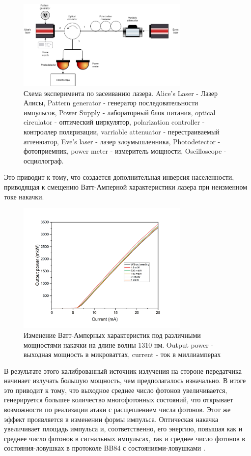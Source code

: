 \begin{figure}
    \centering
    \includegraphics[width=0.75\textwidth]{images/1310 experiment.png}
    \caption{Схема эксперимента по засеиванию лазера. Alice's Laser -  Лазер Алисы, Pattern generator - генератор последовательности импульсов, Power Supply - лабораторный блок питания, optical circulator - оптический циркулятор, polarization controller - контроллер поляризации, varriable attenuator - перестраиваемый аттенюатор, Eve's laser - лазер злоумышленника, Photodetector - фотоприемник, power meter - измеритель мощности, Oscilloscope - осциллограф.}
    \label{fig:exper 1310 ref}
\end{figure}
Это приводит к тому, что создается дополнительная инверсия населенности, приводящая к смещению Ватт-Амперной характеристики лазера при неизменном токе накачки.
\begin{figure}
    \centering
    \includegraphics[width=0.75\textwidth]{images/ватт ампер для диссера.png}
    \caption{Изменение Ватт-Амперных характеристик под различными мощностями накачки на длине волны 1310 нм. Output power - выходная мощность в микроваттах, current - ток в миллиамперах}
    \label{fig:watt-amp ref}
\end{figure}
В результате этого калиброванный источник излучения на стороне передатчика начинает излучать большую мощность, чем предполагалось изначально. В итоге это приводит к тому, что выходное среднее число фотонов увеличивается, генерируется большее количество многофотонных состояний, что открывает возможности по реализации атаки с расщеплением числа фотонов. Этот же эффект проявляется в изменении формы импульса. Оптическая накачка \cite{svelto2010,okamoto2003,guina2017} увеличивает площадь импульса и, соответственно, его энергию, повышая как и среднее число фотонов в сигнальных импульсах, так и среднее число фотонов в состояния-ловушках в протоколе BB84 с состояниями-ловушками \cite{liu2020}.
